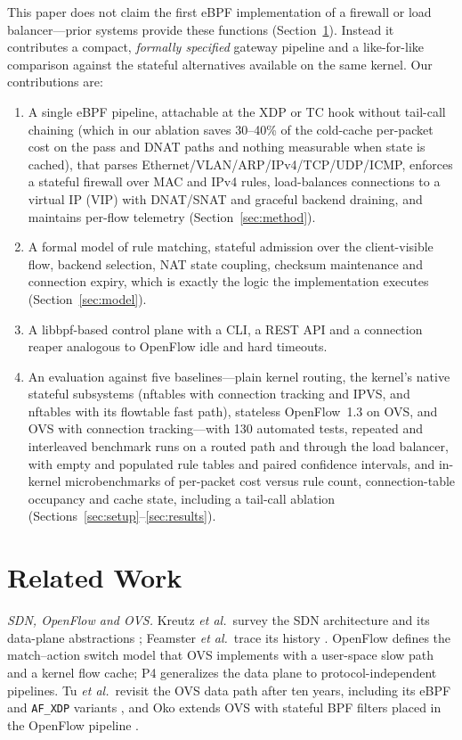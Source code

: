 \documentclass[conference]{IEEEtran}
\begin{document}
This paper does not claim the first eBPF implementation of a firewall or load
balancer---prior systems provide these functions (Section~\ref{sec:related}). Instead it
contributes a compact, \emph{formally specified} gateway pipeline and a
like-for-like comparison against the stateful alternatives available on the
same kernel. Our contributions are:
\begin{enumerate}
\item A single eBPF pipeline, attachable at the XDP or TC hook without
tail-call chaining (which in our ablation saves 30--40\% of the cold-cache
per-packet cost on the pass and DNAT paths and nothing measurable when state
is cached), that parses Ethernet/VLAN/ARP/IPv4/TCP/UDP/ICMP, enforces
a stateful firewall over MAC and IPv4 rules, load-balances connections to a
virtual IP (VIP) with DNAT/SNAT and graceful backend draining, and maintains
per-flow telemetry (Section~\ref{sec:method}).
\item A formal model of rule matching, stateful admission over the
client-visible flow, backend selection, NAT state coupling, checksum
maintenance and connection expiry, which is exactly the logic the
implementation executes (Section~\ref{sec:model}).
\item A libbpf-based control plane with a CLI, a REST API and a connection
reaper analogous to OpenFlow idle and hard timeouts.
\item An evaluation against five baselines---plain kernel routing, the
kernel's native stateful subsystems (nftables with connection tracking and
IPVS, and nftables with its flowtable fast path), stateless OpenFlow~1.3 on
OVS, and OVS with connection tracking---with 130 automated tests, repeated
and interleaved benchmark runs on a routed path and through the load
balancer, with empty and populated rule tables and paired confidence
intervals, and in-kernel
microbenchmarks of per-packet cost versus rule count, connection-table
occupancy and cache state, including a tail-call ablation (Sections~\ref{sec:setup}--\ref{sec:results}).
\end{enumerate}

\section{Related Work}
\label{sec:related}
\textit{SDN, OpenFlow and OVS.} Kreutz \textit{et al.}\ survey the SDN
architecture and its data-plane abstractions \cite{kreutz2015sdn}; Feamster
\textit{et al.}\ trace its history \cite{feamster2014road}. OpenFlow
\cite{mckeown2008openflow} defines the match--action switch model that OVS
\cite{pfaff2015ovs} implements with a user-space slow path and a kernel flow
cache; P4 \cite{bosshart2014p4} generalizes the data plane to
protocol-independent pipelines. Tu \textit{et al.}\ revisit the OVS data path
after ten years, including its eBPF and \texttt{AF\_XDP} variants \cite{tu2021ovs}, and
Oko extends OVS with stateful BPF filters placed in the OpenFlow pipeline
\cite{chaignon2018oko}.
\end{document}
